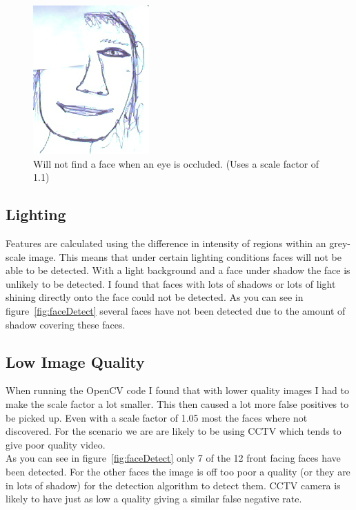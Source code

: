 \documentclass[10pt,a4paper,openbib]{article}
\begin{document}
\begin{multicols}{2}
\begin{figure}[H]
\begin{center}
\includegraphics[scale=0.4]{images/occlusions.png} 
\caption{Will not find a face when an eye is occluded. (Uses a scale factor of 1.1)}
\label{fig:faceHidenEye}
\end{center}
\end{figure}

\subsection{Lighting}

Features are calculated using the difference in intensity of regions within an grey-scale image. This means that under certain lighting conditions faces will not be able to be detected. With a light background and a face under shadow the face is unlikely to be detected.  I found that faces with lots of shadows or lots of light shining directly onto the face could not be detected. As you can see in figure~\ref{fig:faceDetect} several faces have not been detected due to the amount of shadow covering these faces.

\subsection{Low Image Quality}
When running the OpenCV code\cite{faceCode} I found that with lower quality images I had to make the scale factor a lot smaller. This then caused a lot more false positives to be picked up. Even with a scale factor of 1.05 most the faces where not discovered. For the scenario we are are likely to be using CCTV which tends to give poor quality video. \\

\noindent As you can see in figure~\ref{fig:faceDetect} only 7 of the 12 front facing faces have been detected. For the other faces the image is off too poor a quality (or they are in lots of shadow) for the detection algorithm to detect them. CCTV camera is likely to have just as low a quality giving a similar false negative rate. 


\end{multicols}
\end{document}
